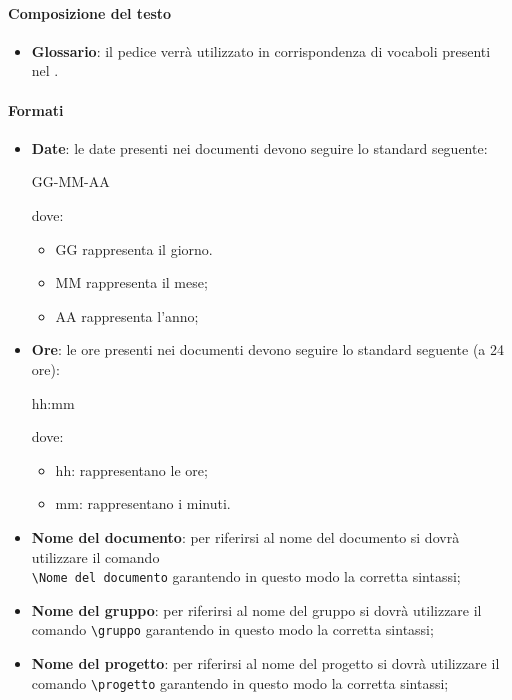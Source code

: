 \paragraph{Composizione del testo}
\begin{itemize}
   \item \textbf{Glossario}: il pedice \termine{} verrà utilizzato in corrispondenza di vocaboli presenti nel \textit{\glossario}.
\end{itemize}

\paragraph{Formati}
\begin{itemize}
   \item \textbf{Date}: le date presenti nei documenti devono seguire lo standard seguente:
   \begin{center}
     GG-MM-AA
   \end{center}
   dove:
   \begin{itemize}
   		\item GG rappresenta il giorno.
     	\item MM rappresenta il mese;
     	\item AA rappresenta l'anno;
   \end{itemize}
   \item \textbf{Ore}: le ore presenti nei documenti devono seguire lo standard seguente (a 24 ore):
   \begin{center}
     hh:mm
   \end{center}
   dove:
   \begin{itemize}
     \item hh: rappresentano le ore;
     \item mm: rappresentano i minuti.
   \end{itemize}
   \item \textbf{Nome del documento}: per riferirsi al nome del documento si
   dovrà utilizzare il comando  \\ \verb|\Nome del documento| garantendo in questo modo la corretta sintassi;
   \item \textbf{Nome del gruppo}: per riferirsi al nome del gruppo si dovrà
   utilizzare il comando  \verb|\gruppo| garantendo in questo modo la corretta sintassi;
   \item \textbf{Nome del progetto}: per riferirsi al nome del progetto si dovrà
   utilizzare il comando  \verb|\progetto| garantendo in questo modo la corretta sintassi;

\end{itemize}
